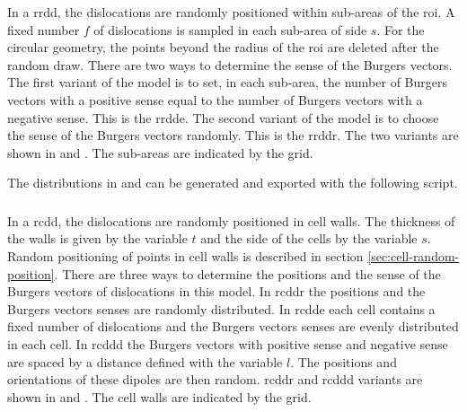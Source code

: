 In a \gls{rrdd}, the dislocations are randomly positioned within sub-areas of the \gls{roi}.
A fixed number \( f \) of dislocations is sampled in each sub-area of side \( s \).
For the circular geometry, the points beyond the radius of the \gls{roi} are deleted after the random draw.
There are two ways to determine the sense of the Burgers vectors.
The first variant of the model is to set, in each sub-area, the number of Burgers vectors with a positive sense equal to the number of Burgers vectors with a negative sense.
This is the \gls{rrdde}.
The second variant of the model is to choose the sense of the Burgers vectors randomly.
This is the \gls{rrddr}.
The two variants are shown in  and .
The sub-areas are indicated by the grid.

%
%

\bigskip \bigskip

The distributions in  and  can be generated and exported with the following script.

\medskip


\newpage

\subsubsection{}\label{sec:distribution-model-rcdd}

In a \gls{rcdd}, the dislocations are randomly positioned in cell walls.
The thickness of the walls is given by the variable \( t \) and the side of the cells by the variable \( s \).
Random positioning of points in cell walls is described in section \ref{sec:cell-random-position}.
There are three ways to determine the positions and the sense of the Burgers vectors of dislocations in this model.
In \gls{rcddr} the positions and the Burgers vectors senses are randomly distributed.
In \gls{rcdde} each cell contains a fixed number of dislocations and the Burgers vectors senses are evenly distributed in each cell.
In \gls{rcddd} the Burgers vectors with positive sense and negative sense are spaced by a distance defined with the variable \( l \).
The positions and orientations of these dipoles are then random.
\gls{rcddr} and \gls{rcddd} variants are shown in  and .
The cell walls are indicated by the grid.

